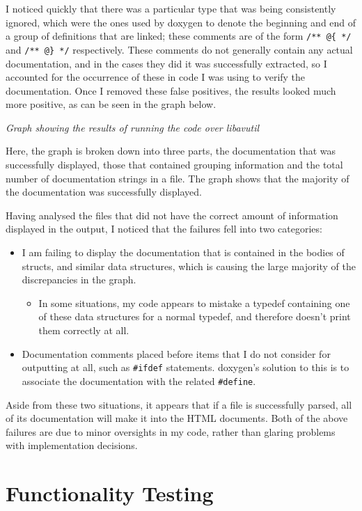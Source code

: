 I noticed quickly that there was a particular type that was being consistently
ignored, which were the ones used by doxygen to denote the beginning and end of
a group of definitions that are linked; these comments are of the form
\lstinline|/** @{ */| and \lstinline|/** @} */| respectively. These comments
do not generally contain any actual documentation, and in the cases they did
it was successfully extracted, so I accounted for the occurrence of these in
code I was using to verify the documentation. Once I removed these false
positives, the results looked much more positive, as can be seen in the graph
below.

\noindent{}
\begin{center}
  \emph{Graph showing the results of running the code over libavutil}
\end{center}

Here, the graph is broken down into three parts, the documentation that was
successfully displayed, those that contained grouping information and the total
number of documentation strings in a file. The graph shows that the majority
of the documentation was successfully displayed.

Having analysed the files that did not have the correct amount of information
displayed in the output, I noticed that the failures fell into two categories:
\begin{itemize}
  \item I am failing to display the documentation that is contained in the
    bodies of structs, and similar data structures, which is causing the large
    majority of the discrepancies in the graph.
    \begin{itemize}
      \item In some situations, my code appears to mistake a typedef
      containing one of these data structures for a normal typedef, and
      therefore doesn't print them correctly at all.
    \end{itemize}
  \item Documentation comments placed before items that I do not consider for
    outputting at all, such as \lstinline|#ifdef| statements. doxygen's
    solution to this is to associate the documentation with the related
    \lstinline|#define|.
\end{itemize}

Aside from these two situations, it appears that if a file is successfully
parsed, all of its documentation will make it into the HTML documents. Both of
the above failures are due to minor oversights in my code, rather than glaring
problems with implementation decisions.

\section{Functionality Testing}
